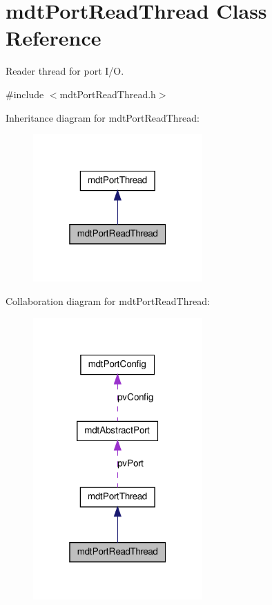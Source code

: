\hypertarget{classmdt_port_read_thread}{
\section{mdtPortReadThread Class Reference}
\label{classmdt_port_read_thread}
}


Reader thread for port I/O.  




{\ttfamily \#include $<$mdtPortReadThread.h$>$}



Inheritance diagram for mdtPortReadThread:\nopagebreak
\begin{figure}[H]
\begin{center}
\leavevmode
\includegraphics[width=184pt]{classmdt_port_read_thread__inherit__graph}
\end{center}
\end{figure}


Collaboration diagram for mdtPortReadThread:\nopagebreak
\begin{figure}[H]
\begin{center}
\leavevmode
\includegraphics[width=184pt]{classmdt_port_read_thread__coll__graph}
\end{center}
\end{figure}
